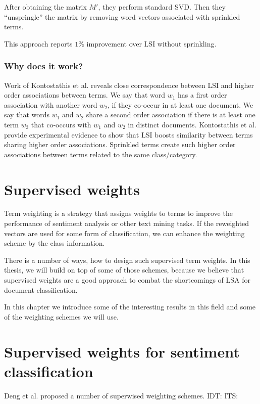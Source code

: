    After obtaining the matrix $M'$, they perform standard SVD. 
    Then they ``unspringle'' the matrix by removing word vectors associated with sprinkled terms.
    
    This approach reports $1\%$ improvement over LSI without sprinkling.
    
    \subsubsection{Why does it work?}
    Work of Kontostathis et al. \cite{kontostathis2006framework} reveals close correspondence between LSI and higher order associations between terms. 
    We say that word $w_1$ has a first order association with another word $w_2$, if they co-occur in at least one document. 
    We say that words $w_1$ and $w_2$ share a second order association if there is at least one term $w_3$ that co-occurs with $w_1$ and $w_2$ in distinct documents. 
    Kontostathis et al. provide experimental evidence to show that LSI boosts similarity between terms sharing higher order associations. 
    Sprinkled terms create such higher order associations between terms related to  the same class/category.
        
\section{Supervised weights} \label{sec:supervised:weights}
    
    Term weighting is a strategy that assigns weights to terms to improve the performance of sentiment analysis or other text mining tasks.
    If the reweighted vectors are used for some form of classification,
    we can enhance the weighting scheme by the class information.
    
    There is a number of ways, how to design such supervised term weights.
    In this thesis, we will build on top of some of those schemes,
    because we believe that supervised weights are a good approach to combat the shortcomings of LSA for document classification.
    
    In this chapter we introduce some of the interesting results in this field and some of the weighting schemes we will use.


    \section{Supervised weights for sentiment classification}
    Deng et al. \cite{deng2014study} %
    proposed a number of superwised weighting schemes.
    \* %
    IDT:
    ITS:
    

